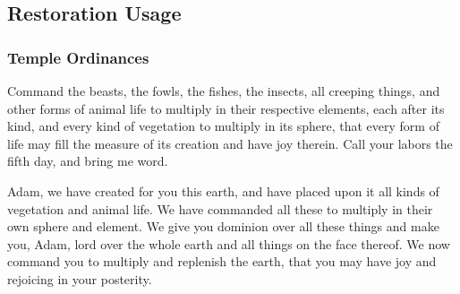 	

\subsection{Restoration Usage} %
	\label{ELEMENT-RESTORATION}

	
		
	\subsubsection{Temple Ordinances}
		\label{ELEMENT-TEMPLE}
	
		\begin{compactdesc}
			\item[{\hyperref[TEMPLE-ENDOWMENT-ENDOW-PRE-1990-DAY5]{Fifth day of creation}}] Command the beasts, the fowls, the fishes, the insects, all creeping things, and other forms of animal life to multiply in their respective elements, each after its kind, and every kind of vegetation to multiply in its sphere, that every form of life may fill the measure of its creation and have joy therein. Call your labors the fifth day, and bring me word.
			\item[{\hyperref[TEMPLE-ENDOWMENT-ENDOW-PRE-1990-GARDEN]{Garden}}] Adam, we have created for you this earth, and have placed upon it all kinds of vegetation and animal life. We have commanded all these to multiply in their own sphere and element. We give you dominion over all these things and make you, Adam, lord over the whole earth and all things on the face thereof. We now command you to multiply and replenish the earth, that you may have joy and rejoicing in your posterity.
		\end{compactdesc}
	
